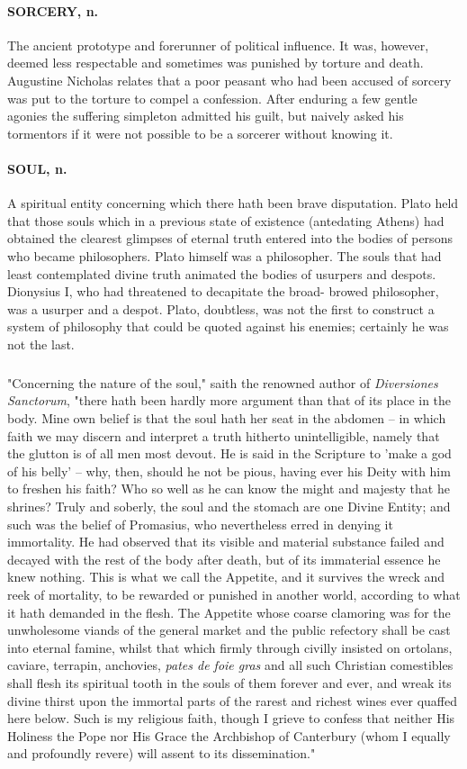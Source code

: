 \documentclass[11pt]{article}
\begin{document}
\paragraph{SORCERY, n.}  The ancient prototype and forerunner of political
influence.  It was, however, deemed less respectable and sometimes was
punished by torture and death.  Augustine Nicholas relates that a poor
peasant who had been accused of sorcery was put to the torture to
compel a confession.  After enduring a few gentle agonies the
suffering simpleton admitted his guilt, but naively asked his
tormentors if it were not possible to be a sorcerer without knowing
it.

\paragraph{SOUL, n.}  A spiritual entity concerning which there hath been brave
disputation.  Plato held that those souls which in a previous state of
existence (antedating Athens) had obtained the clearest glimpses of
eternal truth entered into the bodies of persons who became
philosophers.  Plato himself was a philosopher.  The souls that had
least contemplated divine truth animated the bodies of usurpers and
despots.  Dionysius I, who had threatened to decapitate the broad-
browed philosopher, was a usurper and a despot.  Plato, doubtless, was
not the first to construct a system of philosophy that could be quoted
against his enemies; certainly he was not the last.
\subparagraph{}   "Concerning the nature of the soul," saith the renowned author of
{\em Diversiones Sanctorum}, "there hath been hardly more argument than
that of its place in the body.  Mine own belief is that the soul hath
her seat in the abdomen -- in which faith we may discern and interpret
a truth hitherto unintelligible, namely that the glutton is of all men
most devout.  He is said in the Scripture to 'make a god of his belly'
-- why, then, should he not be pious, having ever his Deity with him
to freshen his faith?  Who so well as he can know the might and
majesty that he shrines?  Truly and soberly, the soul and the stomach
are one Divine Entity; and such was the belief of Promasius, who
nevertheless erred in denying it immortality.  He had observed that
its visible and material substance failed and decayed with the rest of
the body after death, but of its immaterial essence he knew nothing.
This is what we call the Appetite, and it survives the wreck and reek
of mortality, to be rewarded or punished in another world, according
to what it hath demanded in the flesh.  The Appetite whose coarse
clamoring was for the unwholesome viands of the general market and the
public refectory shall be cast into eternal famine, whilst that which
firmly through civilly insisted on ortolans, caviare, terrapin,
anchovies, {\em pates de foie gras} and all such Christian comestibles
shall flesh its spiritual tooth in the souls of them forever and ever,
and wreak its divine thirst upon the immortal parts of the rarest and
richest wines ever quaffed here below.  Such is my religious faith,
though I grieve to confess that neither His Holiness the Pope nor His
Grace the Archbishop of Canterbury (whom I equally and profoundly
revere) will assent to its dissemination."
\end{document}
